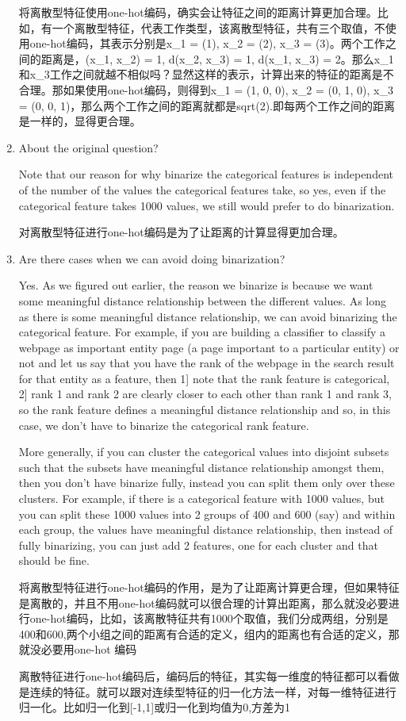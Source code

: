 \documentclass[10pt,a4paper]{ctexbook}
\begin{document}
\begin{enumerate}
将离散型特征使用one-hot编码，确实会让特征之间的距离计算更加合理。比如，有一个离散型特征，代表工作类型，该离散型特征，共有三个取值，不使用one-hot编码，其表示分别是x\_1 = (1), x\_2 = (2), x\_3 = (3)。两个工作之间的距离是，(x\_1, x\_2) = 1, d(x\_2, x\_3) = 1, d(x\_1, x\_3) = 2。那么x\_1和x\_3工作之间就越不相似吗？显然这样的表示，计算出来的特征的距离是不合理。那如果使用one-hot编码，则得到x\_1 = (1, 0, 0), x\_2 = (0, 1, 0), x\_3 = (0, 0, 1)，那么两个工作之间的距离就都是sqrt(2).即每两个工作之间的距离是一样的，显得更合理。

\item About the original question?

Note that our reason for why binarize the categorical features is independent of the number of the values the categorical features take, so yes, even if the categorical feature takes 1000 values, we still would prefer to do binarization.

对离散型特征进行one-hot编码是为了让距离的计算显得更加合理。

\item Are there cases when we can avoid doing binarization?

Yes. As we figured out earlier, the reason we binarize is because we want some meaningful distance relationship between the different values. As long as there is some meaningful distance relationship, we can avoid binarizing the categorical feature. For example, if you are building a classifier to classify a webpage as important entity page (a page important to a particular entity) or not and let us say that you have the rank of the webpage in the search result for that entity as a feature, then 1] note that the rank feature is categorical, 2] rank 1 and rank 2 are clearly closer to each other than rank 1 and rank 3, so the rank feature defines a meaningful distance relationship and so, in this case, we don't have to binarize the categorical rank feature.

More generally, if you can cluster the categorical values into disjoint subsets such that the subsets have meaningful distance relationship amongst them, then you don't have binarize fully, instead you can split them only over these clusters. For example, if there is a categorical feature with 1000 values, but you can split these 1000 values into 2 groups of 400 and 600 (say) and within each group, the values have meaningful distance relationship, then instead of fully binarizing, you can just add 2 features, one for each cluster and that should be fine.

将离散型特征进行one-hot编码的作用，是为了让距离计算更合理，但如果特征是离散的，并且不用one-hot编码就可以很合理的计算出距离，那么就没必要进行one-hot编码，比如，该离散特征共有1000个取值，我们分成两组，分别是400和600,两个小组之间的距离有合适的定义，组内的距离也有合适的定义，那就没必要用one-hot 编码
 
离散特征进行one-hot编码后，编码后的特征，其实每一维度的特征都可以看做是连续的特征。就可以跟对连续型特征的归一化方法一样，对每一维特征进行归一化。比如归一化到[-1,1]或归一化到均值为0,方差为1
\end{enumerate}
 
\end{document}
